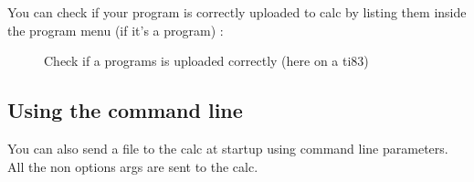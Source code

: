 \documentclass[10pt]{report}
\begin{document}
You can check if your program is correctly uploaded to calc by listing them inside the program menu (if it's a program) :
\begin{figure}[H]
\centering
{}
\caption{Check if a programs is uploaded correctly (here on a ti83)}
\end{figure}

\subsection{Using the command line}

You can also send a file to the calc at startup using command line parameters.\newline
All the non options args are sent to the calc.\newline
\end{document}
